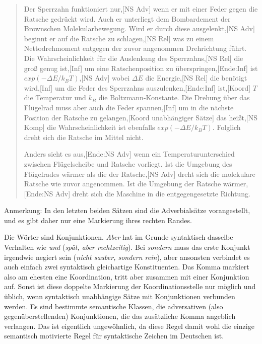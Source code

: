 \begin{sloppypar}
\begin{quote}
Der Sperrzahn funktioniert nur,[NS Adv] wenn er mit einer Feder gegen die Ratsche gedrückt wird.
Auch er unterliegt dem Bombardement der Brownschen Molekularbewegung.
Wird er durch diese ausgelenkt,[NS Adv] beginnt er auf die Ratsche zu schlagen,[NS Rel] was zu einem Nettodrehmoment entgegen der zuvor angenommen Drehrichtung führt.
Die Wahrscheinlichkeit für die Auslenkung des Sperrzahns,[NS Rel] die groß genug ist,[Inf] um eine Ratschenposition zu überspringen,[Ende:Inf] ist $exp(-\Delta E/k_BT)$,[NS Adv] wobei $\Delta E$ die Energie,[NS Rel] die benötigt wird,[Inf] um die Feder des Sperrzahns auszulenken,[Ende:Inf] ist,[Koord] $T$ die Temperatur und $k_B$ die Boltzmann-Konstante.
Die Drehung über das Flügelrad muss aber auch die Feder spannen,[Inf] um in die nächste Position der Ratsche zu gelangen,[Koord unabhängiger Sätze] das heißt,[NS Komp] die Wahrscheinlichkeit ist ebenfalls $exp(-\Delta E/k_BT)$.
Folglich dreht sich die Ratsche im Mittel nicht.

Anders sieht es aus,[Ende:NS Adv] wenn ein Temperaturunterschied zwischen Flügelscheibe und Ratsche vorliegt.
Ist die Umgebung des Flügelrades wärmer als die der Ratsche,[NS Adv] dreht sich die molekulare Ratsche wie zuvor angenommen.
Ist die Umgebung der Ratsche wärmer,[Ende:NS Adv] dreht sich die Maschine in die entgegengesetzte Richtung.
\end{quote}
\end{sloppypar}

Anmerkung: In den letzten beiden Sätzen sind die Adverbialsätze vorangestellt, und es gibt daher nur eine Markierung ihres rechten Randes.

 Die Wörter sind Konjunktionen.
\textit{Aber} hat im Grunde syntaktisch dasselbe Verhalten wie \textit{und} (\textit{spät, aber rechtzeitig}).
Bei \textit{sondern} muss das erste Konjunkt irgendwie negiert sein (\textit{nicht sauber, sondern rein}), aber ansonsten verbindet es auch einfach zwei syntaktisch gleichartige Konstituenten.
Das Komma markiert also am ehesten eine Koordination, tritt aber zusammen mit einer Konjunktion auf.
Sonst ist diese doppelte Markierung der Koordinationsstelle nur möglich und üblich, wenn syntaktisch unabhängige Sätze mit Konjunktionen verbunden werden.
Es sind bestimmte semantische Klassen, \zB die adversativen (also gegenüberstellenden) Konjunktionen, die das zusätzliche Komma angeblich verlangen.
Das ist eigentlich ungewöhnlich, da diese Regel damit wohl die einzige semantisch motivierte Regel für syntaktische Zeichen im Deutschen ist.

